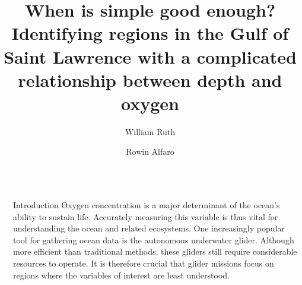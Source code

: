 \documentclass[final]{beamer}
\title{When is simple good enough? Identifying regions in the Gulf of Saint Lawrence with a complicated relationship between depth and oxygen}
\author{William Ruth \and Rowin Alfaro}
\institute[shortinst]{Universit\'e de Montr\'eal}
\newlength{\sepwidth}
\newlength{\colwidth}
\newcommand{\separatorcolumn}{\begin{column}{\sepwidth}\end{column}}
\begin{document}



\begin{frame}[t]
\begin{columns}[t]
\separatorcolumn

\begin{column}{\colwidth}

\vspace{-30pt}

  \begin{block}{Introduction}
    Oxygen concentration is a major determinant of the ocean's ability to sustain life. Accurately measuring this variable is thus vital for understanding the ocean and related ecosystems. One increasingly popular tool for gathering ocean data is the autonomous underwater glider. Although more efficient than traditional methods, these gliders still require considerable resources to operate. It is therefore crucial that glider missions focus on regions where the variables of interest are least understood. 
    
    

  \end{block}

\vspace{-15pt}


\end{column}
\end{columns}
\end{frame}
\end{document}

